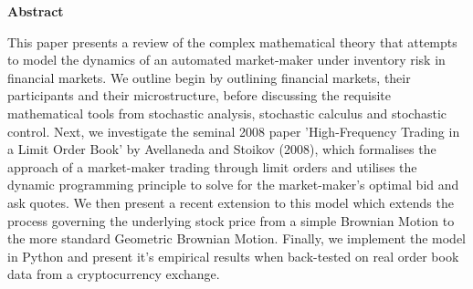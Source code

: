 \thispagestyle{plain}
\mbox{}
\vspace{60mm}
\begin{center}
    \textbf{Abstract}
\end{center}
This paper presents a review of the complex mathematical theory that attempts to model the dynamics of an 
automated market-maker under inventory risk in financial markets. We outline begin by outlining financial markets, 
their participants and their microstructure, before discussing the requisite mathematical tools from stochastic analysis, 
stochastic calculus and stochastic control. Next, we investigate the seminal 2008 paper 
'High-Frequency Trading in a Limit Order Book' by Avellaneda and Stoikov (2008), which formalises the approach of a 
market-maker trading through limit orders and utilises the dynamic programming principle to solve for the market-maker's 
optimal bid and ask quotes. We then present a recent extension to this model which extends the process governing the 
underlying stock price from a simple Brownian Motion to the more standard Geometric Brownian Motion. 
Finally, we implement the model in Python and present it's empirical results when back-tested on real order book data 
from a cryptocurrency exchange.
\newpage